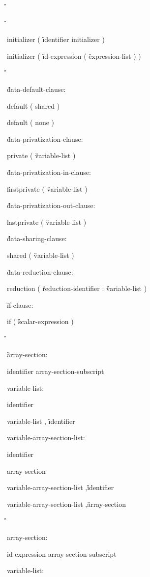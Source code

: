 {\begin{samepage}
\G\cspecificend
\end{samepage}

\G\cppspecificstart

\C\I initializer \C ( \G identifier initializer \C )

\I initializer \C ( \G id-expression \C ( \G expression-list \C ) ) 

\G\cppspecificend

\G data-default-clause:

\C\I default ( shared )

\I default ( none )

\G data-privatization-clause:

\C\I private ( \G variable-list \C )

\G data-privatization-in-clause:

\C\I firstprivate ( \G variable-list \C )

\G data-privatization-out-clause:

\C\I lastprivate ( \G variable-list \C )

\G data-sharing-clause:

\C\I shared ( \G variable-list \C )

\G data-reduction-clause:

\C\I reduction ( \G reduction-identifier \C : \G variable-list \C )

\G if-clause:

\C\I if ( \G scalar-expression \C )

\G\cspecificstart

\G array-section:

\I identifier array-section-subscript

variable-list:

\I identifier

\I variable-list \C, \G identifier

variable-array-section-list:

\I identifier

\I array-section

\I variable-array-section-list \C ,\G identifier

\I variable-array-section-list \C ,\G array-section

\G\cspecificend

\cppspecificstart

\I array-section:

\I id-expression array-section-subscript

variable-list:

}
